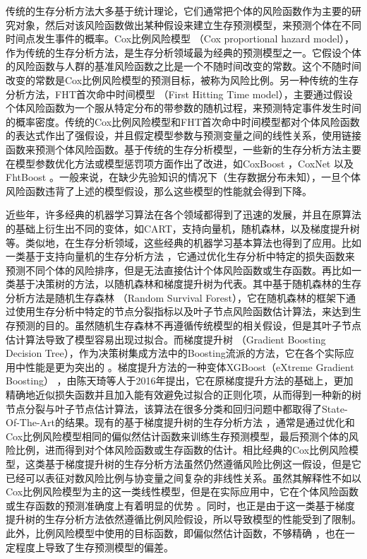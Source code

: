 传统的生存分析方法大多基于统计理论，它们通常把个体的风险函数作为主要的研究对象，然后对该风险函数做出某种假设来建立生存预测模型，来预测个体在不同时间点发生事件的概率。Cox比例风险模型 （Cox proportional hazard model），作为传统的生存分析方法，是生存分析领域最为经典的预测模型之一。它假设个体的风险函数与人群的基准风险函数之比是一个不随时间改变的常数。这个不随时间改变的常数是Cox比例风险模型的预测目标，被称为风险比例。另一种传统的生存分析方法，FHT首次命中时间模型 （First Hitting Time model），主要通过假设个体风险函数为一个服从特定分布的带参数的随机过程，来预测特定事件发生时间的概率密度。传统的Cox比例风险模型和FHT首次命中时间模型都对个体风险函数的表达式作出了强假设，并且假定模型参数与预测变量之间的线性关系，使用链接函数来预测个体风险函数。基于传统的生存分析模型，一些新的生存分析方法主要在模型参数优化方法或模型惩罚项方面作出了改进，如CoxBoost ，CoxNet 以及FhtBoost 。一般来说，在缺少先验知识的情况下（生存数据分布未知），一旦个体风险函数违背了上述的模型假设，那么这些模型的性能就会得到下降。

近些年，许多经典的机器学习算法在各个领域都得到了迅速的发展，并且在原算法的基础上衍生出不同的变体，如CART，支持向量机，随机森林，以及梯度提升树等。类似地，在生存分析领域，这些经典的机器学习基本算法也得到了应用。比如一类基于支持向量机的生存分析方法 ，它通过优化生存分析中特定的损失函数来预测不同个体的风险排序，但是无法直接估计个体风险函数或生存函数。再比如一类基于决策树的方法，以随机森林和梯度提升树为代表。其中基于随机森林的生存分析方法是随机生存森林 （Random Survival Forest），它在随机森林的框架下通过使用生存分析中特定的节点分裂指标以及叶子节点风险函数估计算法，来达到生存预测的目的。虽然随机生存森林不再遵循传统模型的相关假设，但是其叶子节点估计算法导致了模型容易出现过拟合。而梯度提升树 （Gradient Boosting Decision Tree），作为决策树集成方法中的Boosting流派的方法，它在各个实际应用中性能是更为突出的 。梯度提升方法的一种变体XGBoost（eXtreme Gradient Boosting） ，由陈天琦等人于2016年提出，它在原梯度提升方法的基础上，更加精确地近似损失函数并且加入能有效避免过拟合的正则化项，从而得到一种新的树节点分裂与叶子节点估计算法，该算法在很多分类和回归问题中都取得了State-Of-The-Art的结果。现有的基于梯度提升树的生存分析方法 ，通常是通过优化和Cox比例风险模型相同的偏似然估计函数来训练生存预测模型，最后预测个体的风险比例，进而得到对个体风险函数或生存函数的估计。相比经典的Cox比例风险模型，这类基于梯度提升树的生存分析方法虽然仍然遵循风险比例这一假设，但是它已经可以表征对数风险比例与协变量之间复杂的非线性关系。虽然其解释性不如以Cox比例风险模型为主的这一类线性模型，但是在实际应用中，它在个体风险函数或生存函数的预测准确度上有着明显的优势 。同时，也正是由于这一类基于梯度提升树的生存分析方法依然遵循比例风险假设，所以导致模型的性能受到了限制。此外，比例风险模型中使用的目标函数，即偏似然估计函数，不够精确 ，也在一定程度上导致了生存预测模型的偏差。
    
